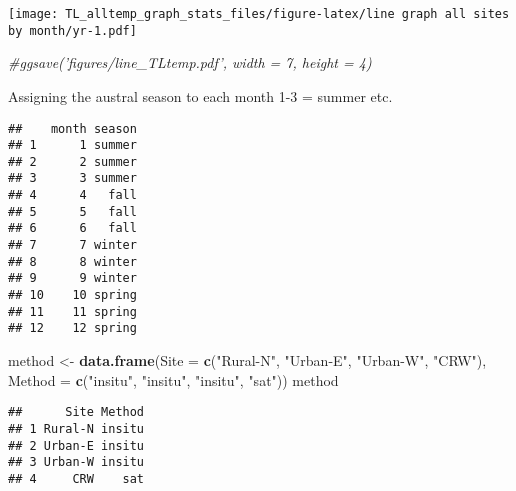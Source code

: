 \documentclass[
]{article}
\newenvironment{Shaded}{\begin{snugshade}}{\end{snugshade}}
\newcommand{\CommentTok}[1]{\textcolor[rgb]{0.56,0.35,0.01}{\textit{#1}}}
\newcommand{\DataTypeTok}[1]{\textcolor[rgb]{0.13,0.29,0.53}{#1}}
\newcommand{\DecValTok}[1]{\textcolor[rgb]{0.00,0.00,0.81}{#1}}
\newcommand{\KeywordTok}[1]{\textcolor[rgb]{0.13,0.29,0.53}{\textbf{#1}}}
\newcommand{\NormalTok}[1]{#1}
\newcommand{\OperatorTok}[1]{\textcolor[rgb]{0.81,0.36,0.00}{\textbf{#1}}}
\newcommand{\StringTok}[1]{\textcolor[rgb]{0.31,0.60,0.02}{#1}}
\begin{document}
\texttt{[image: TL\_alltemp\_graph\_stats\_files/figure-latex/line graph all sites by month/yr-1.pdf]}

\begin{Shaded}
\begin{Highlighting}[]
\CommentTok{#ggsave('figures/line_TLtemp.pdf', width = 7, height = 4)}
\end{Highlighting}
\end{Shaded}

Assigning the austral season to each month 1-3 = summer etc.

\begin{Shaded}
\end{Shaded}

\begin{verbatim}
##    month season
## 1      1 summer
## 2      2 summer
## 3      3 summer
## 4      4   fall
## 5      5   fall
## 6      6   fall
## 7      7 winter
## 8      8 winter
## 9      9 winter
## 10    10 spring
## 11    11 spring
## 12    12 spring
\end{verbatim}

\begin{Shaded}
\begin{Highlighting}[]
\NormalTok{method <-}\StringTok{ }\KeywordTok{data.frame}\NormalTok{(}\DataTypeTok{Site =} \KeywordTok{c}\NormalTok{(}\StringTok{"Rural-N"}\NormalTok{, }\StringTok{"Urban-E"}\NormalTok{, }\StringTok{"Urban-W"}\NormalTok{, }\StringTok{"CRW"}\NormalTok{), }\DataTypeTok{Method =} \KeywordTok{c}\NormalTok{(}\StringTok{"insitu"}\NormalTok{, }\StringTok{"insitu"}\NormalTok{, }\StringTok{"insitu"}\NormalTok{, }\StringTok{"sat"}\NormalTok{))}
\NormalTok{method}
\end{Highlighting}
\end{Shaded}

\begin{verbatim}
##      Site Method
## 1 Rural-N insitu
## 2 Urban-E insitu
## 3 Urban-W insitu
## 4     CRW    sat
\end{verbatim}
\end{document}
